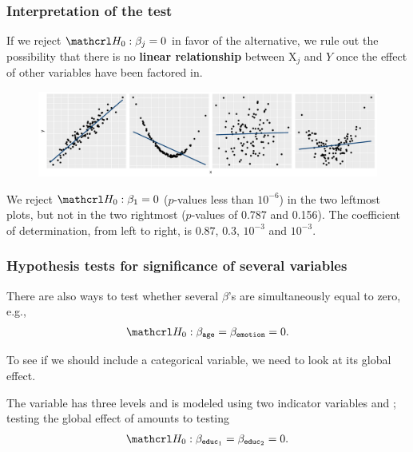 \documentclass{beamer}
\begin{document}
\begin{frame}[fragile]
\frametitle{Interpretation of the test}
 If we reject $\Hy_0: \beta_j=0$ in favor of the alternative, we rule out the possibility that there is no \textbf{linear relationship} between $\mathrm{X}_j$ and $Y$ once the effect of other variables have been factored in.

\begin{figure}
 \centering
 \includegraphics[width = \textwidth]{img/c2/03-linreg-fourplots}
\end{figure}
{
\footnotesize 
We reject $\Hy_0: \beta_1 = 0$ ($p$-values less than $10^{-6}$) in the two leftmost plots, but not in the two rightmost ($p$-values of 0.787 and 0.156). The coefficient of determination, from left to right, is $0.87$, $0.3$, $10^{-3}$ and $10^{-3}$.

}
\end{frame}

\begin{frame}
\frametitle{Hypothesis tests for significance of several variables}
\bi
\item There are also ways to test whether \alert{several} $\beta$'s are simultaneously equal to zero, e.g., 
\begin{align*}
\Hy_0: \beta_{\code{age}}=\beta_{\code{emotion}}=0.
\end{align*}
\item To see if we should include a categorical variable, we need to look at its \alert{global effect}.
\bi 
\item The variable  has three levels and is modeled using two indicator variables  and ; testing the global effect of  amounts to testing
\begin{align*}
\Hy_0: \beta_{\code{educ}_1}=\beta_{\code{educ}_2}=0.
\end{align*}
\ei
\ei
\end{frame}
\end{document}
